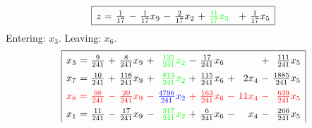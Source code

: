 \documentclass[11pt]{article}
\begin{document}
\begin{equation*}
\begin{array}{|rcrcrcrcrcrcr|}
\hline
z \mspace{-6mu}&\mspace{-6mu} = \mspace{-6mu}&\mspace{-6mu} \frac{1}{17} \mspace{-6mu}&\mspace{-6mu} - \mspace{-6mu}&\mspace{-6mu} \frac{1}{17} x_{9} \mspace{-6mu}&\mspace{-6mu} - \mspace{-6mu}&\mspace{-6mu} \frac{2}{17} x_{2} \mspace{-6mu}&\mspace{-6mu} + \mspace{-6mu}&\color{green}\mspace{-6mu} \frac{11}{17} x_{3} \mspace{-6mu}&\mspace{-6mu}  \mspace{-6mu}&\mspace{-6mu}  \mspace{-6mu}&\mspace{-6mu} + \mspace{-6mu}&\mspace{-6mu} \frac{1}{17} x_{5}\\
\hline
\end{array}
\end{equation*}
Entering: $x_{3}$. Leaving: $x_{6}$. 
\begin{equation*}
\renewcommand{\arraystretch}{1.5} %
\begin{array}{|rcrcrcrcrcrcr|}
\hline
x_{3} \mspace{-6mu}&\mspace{-6mu} = \mspace{-6mu}&\mspace{-6mu} \frac{9}{241} \mspace{-6mu}&\mspace{-6mu} + \mspace{-6mu}&\mspace{-6mu} \frac{8}{241} x_{9} \mspace{-6mu}&\mspace{-6mu} + \mspace{-6mu}&\color{green}\mspace{-6mu} \frac{135}{241} x_{2} \mspace{-6mu}&\mspace{-6mu} - \mspace{-6mu}&\mspace{-6mu} \frac{17}{241} x_{6} \mspace{-6mu}&\mspace{-6mu}  \mspace{-6mu}&\mspace{-6mu}  \mspace{-6mu}&\mspace{-6mu} + \mspace{-6mu}&\mspace{-6mu} \frac{111}{241} x_{5}\\
x_{7} \mspace{-6mu}&\mspace{-6mu} = \mspace{-6mu}&\mspace{-6mu} \frac{10}{241} \mspace{-6mu}&\mspace{-6mu} + \mspace{-6mu}&\mspace{-6mu} \frac{116}{241} x_{9} \mspace{-6mu}&\mspace{-6mu} + \mspace{-6mu}&\color{green}\mspace{-6mu} \frac{873}{241} x_{2} \mspace{-6mu}&\mspace{-6mu} + \mspace{-6mu}&\mspace{-6mu} \frac{115}{241} x_{6} \mspace{-6mu}&\mspace{-6mu} + \mspace{-6mu}&\mspace{-6mu} 2 x_{4} \mspace{-6mu}&\mspace{-6mu} - \mspace{-6mu}&\mspace{-6mu} \frac{1885}{241} x_{5}\\
\color{red}x_{8} \mspace{-6mu}&\color{red}\mspace{-6mu} = \mspace{-6mu}&\color{red}\mspace{-6mu} \frac{98}{241} \mspace{-6mu}&\color{red}\mspace{-6mu} - \mspace{-6mu}&\color{red}\mspace{-6mu} \frac{20}{241} x_{9} \mspace{-6mu}&\color{red}\mspace{-6mu} - \mspace{-6mu}&\color{blue}\mspace{-6mu} \frac{4796}{241} x_{2} \mspace{-6mu}&\color{red}\mspace{-6mu} + \mspace{-6mu}&\color{red}\mspace{-6mu} \frac{163}{241} x_{6} \mspace{-6mu}&\color{red}\mspace{-6mu} - \mspace{-6mu}&\color{red}\mspace{-6mu} 11 x_{4} \mspace{-6mu}&\color{red}\mspace{-6mu} - \mspace{-6mu}&\color{red}\mspace{-6mu} \frac{639}{241} x_{5}\\
x_{1} \mspace{-6mu}&\mspace{-6mu} = \mspace{-6mu}&\mspace{-6mu} \frac{11}{241} \mspace{-6mu}&\mspace{-6mu} - \mspace{-6mu}&\mspace{-6mu} \frac{17}{241} x_{9} \mspace{-6mu}&\mspace{-6mu} - \mspace{-6mu}&\color{green}\mspace{-6mu} \frac{317}{241} x_{2} \mspace{-6mu}&\mspace{-6mu} + \mspace{-6mu}&\mspace{-6mu} \frac{6}{241} x_{6} \mspace{-6mu}&\mspace{-6mu} - \mspace{-6mu}&\mspace{-6mu} x_{4} \mspace{-6mu}&\mspace{-6mu} - \mspace{-6mu}&\mspace{-6mu} \frac{266}{241} x_{5}\\

\end{array}
\end{equation*}
\end{document}
